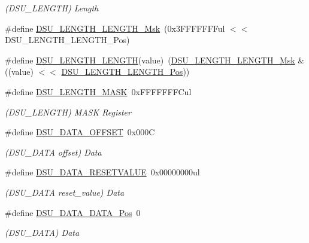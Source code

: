 \begin{DoxyCompactItemize}
\begin{DoxyCompactList}\small\item\em (D\+S\+U\+\_\+\+L\+E\+N\+G\+TH) Length \end{DoxyCompactList}\item 
\#define \mbox{\hyperlink{group___s_a_m_d21___d_s_u_gaf8420428fca225dd9b92fb53c4498124}{D\+S\+U\+\_\+\+L\+E\+N\+G\+T\+H\+\_\+\+L\+E\+N\+G\+T\+H\+\_\+\+Msk}}~(0x3\+F\+F\+F\+F\+F\+F\+Ful $<$$<$ D\+S\+U\+\_\+\+L\+E\+N\+G\+T\+H\+\_\+\+L\+E\+N\+G\+T\+H\+\_\+\+Pos)
\item 
\#define \mbox{\hyperlink{group___s_a_m_d21___d_s_u_ga89bbb4abfbd477e9791957d57d5baf5f}{D\+S\+U\+\_\+\+L\+E\+N\+G\+T\+H\+\_\+\+L\+E\+N\+G\+TH}}(value)~(\mbox{\hyperlink{group___s_a_m_d21___d_s_u_gaf8420428fca225dd9b92fb53c4498124}{D\+S\+U\+\_\+\+L\+E\+N\+G\+T\+H\+\_\+\+L\+E\+N\+G\+T\+H\+\_\+\+Msk}} \& ((value) $<$$<$ \mbox{\hyperlink{group___s_a_m_d21___d_s_u_ga6aa7babac0719eb769c08ca1a945aa57}{D\+S\+U\+\_\+\+L\+E\+N\+G\+T\+H\+\_\+\+L\+E\+N\+G\+T\+H\+\_\+\+Pos}}))
\item 
\#define \mbox{\hyperlink{group___s_a_m_d21___d_s_u_ga1bdb22215616287bf9f8ee6b97e7f803}{D\+S\+U\+\_\+\+L\+E\+N\+G\+T\+H\+\_\+\+M\+A\+SK}}~0x\+F\+F\+F\+F\+F\+F\+F\+Cul
\begin{DoxyCompactList}\small\item\em (D\+S\+U\+\_\+\+L\+E\+N\+G\+TH) M\+A\+SK Register \end{DoxyCompactList}\item 
\#define \mbox{\hyperlink{group___s_a_m_d21___d_s_u_ga723e04c18648c402a75cce7e93de351a}{D\+S\+U\+\_\+\+D\+A\+T\+A\+\_\+\+O\+F\+F\+S\+ET}}~0x000C
\begin{DoxyCompactList}\small\item\em (D\+S\+U\+\_\+\+D\+A\+TA offset) Data \end{DoxyCompactList}\item 
\#define \mbox{\hyperlink{group___s_a_m_d21___d_s_u_ga3a9b805b6870ba197f179b0c6cc366ab}{D\+S\+U\+\_\+\+D\+A\+T\+A\+\_\+\+R\+E\+S\+E\+T\+V\+A\+L\+UE}}~0x00000000ul
\begin{DoxyCompactList}\small\item\em (D\+S\+U\+\_\+\+D\+A\+TA reset\+\_\+value) Data \end{DoxyCompactList}\item 
\#define \mbox{\hyperlink{group___s_a_m_d21___d_s_u_ga035409bf73a654618f87c65e2742bc35}{D\+S\+U\+\_\+\+D\+A\+T\+A\+\_\+\+D\+A\+T\+A\+\_\+\+Pos}}~0
\begin{DoxyCompactList}\small\item\em (D\+S\+U\+\_\+\+D\+A\+TA) Data \end{DoxyCompactList}\item 

\end{DoxyCompactItemize}
